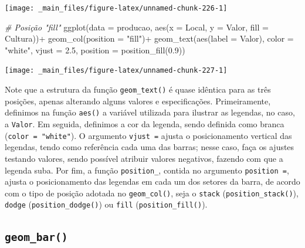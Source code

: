 \documentclass[
  brazilian,
]{book}
\newenvironment{Shaded}{\begin{snugshade}}{\end{snugshade}}
\newcommand{\AttributeTok}[1]{\textcolor[rgb]{0.77,0.63,0.00}{#1}}
\newcommand{\CommentTok}[1]{\textcolor[rgb]{0.56,0.35,0.01}{\textit{#1}}}
\newcommand{\FloatTok}[1]{\textcolor[rgb]{0.00,0.00,0.81}{#1}}
\newcommand{\FunctionTok}[1]{\textcolor[rgb]{0.00,0.00,0.00}{#1}}
\newcommand{\NormalTok}[1]{#1}
\newcommand{\SpecialCharTok}[1]{\textcolor[rgb]{0.00,0.00,0.00}{#1}}
\newcommand{\StringTok}[1]{\textcolor[rgb]{0.31,0.60,0.02}{#1}}
\begin{document}
\begin{center}\texttt{[image: \_main\_files/figure-latex/unnamed-chunk-226-1]} \end{center}

\begin{Shaded}
\begin{Highlighting}[]
\CommentTok{\# Posição "fill"}
\FunctionTok{ggplot}\NormalTok{(}\AttributeTok{data =}\NormalTok{ producao,}
       \FunctionTok{aes}\NormalTok{(}\AttributeTok{x =}\NormalTok{ Local,}
           \AttributeTok{y =}\NormalTok{ Valor,}
           \AttributeTok{fill =}\NormalTok{ Cultura))}\SpecialCharTok{+}
  \FunctionTok{geom\_col}\NormalTok{(}\AttributeTok{position =} \StringTok{"fill"}\NormalTok{)}\SpecialCharTok{+}
  \FunctionTok{geom\_text}\NormalTok{(}\FunctionTok{aes}\NormalTok{(}\AttributeTok{label =}\NormalTok{ Valor),}
            \AttributeTok{color =} \StringTok{"white"}\NormalTok{,}
            \AttributeTok{vjust =} \FloatTok{2.5}\NormalTok{,}
            \AttributeTok{position =} \FunctionTok{position\_fill}\NormalTok{(}\FloatTok{0.9}\NormalTok{))}
\end{Highlighting}
\end{Shaded}

\begin{center}\texttt{[image: \_main\_files/figure-latex/unnamed-chunk-227-1]} \end{center}

Note que a estrutura da função \texttt{geom\_text()} é quase idêntica para as três posições, apenas alterando alguns valores e especificações. Primeiramente, definimos na função \texttt{aes()} a variável utilizada para ilustrar as legendas, no caso, a \texttt{Valor}. Em seguida, definimos a cor da legenda, sendo definida como branca (\texttt{color\ =\ "white"}). O argumento \texttt{vjust\ =} ajusta o posicionamento vertical das legendas, tendo como referência cada uma das barras; nesse caso, faça os ajustes testando valores, sendo possível atribuir valores negativos, fazendo com que a legenda suba. Por fim, a função \texttt{position\_}, contida no argumento \texttt{position\ =}, ajusta o posicionamento das legendas em cada um dos setores da barra, de acordo com o tipo de posição adotada no \texttt{geom\_col()}, seja o \texttt{stack} (\texttt{position\_stack()}), \texttt{dodge} (\texttt{position\_dodge()}) ou \texttt{fill} (\texttt{position\_fill()}).

\hypertarget{geom_bar}{%
\subsection*{\texorpdfstring{\texttt{geom\_bar()}}{geom\_bar()}}\label{geom_bar}}
\end{document}

